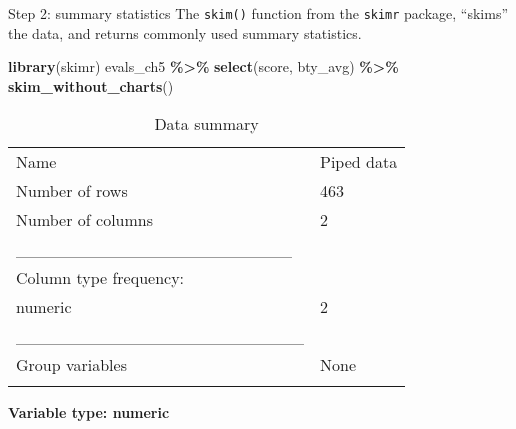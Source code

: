 \documentclass[
  ignorenonframetext,
]{beamer}
\newenvironment{Shaded}{\begin{snugshade}}{\end{snugshade}}
\newcommand{\FunctionTok}[1]{\textcolor[rgb]{0.13,0.29,0.53}{\textbf{#1}}}
\newcommand{\NormalTok}[1]{#1}
\newcommand{\SpecialCharTok}[1]{\textcolor[rgb]{0.81,0.36,0.00}{\textbf{#1}}}
\begin{document}
\begin{frame}[fragile]{Step 2: summary statistics}
\protect\hypertarget{step-2-summary-statistics-1}{}
The \texttt{skim()} function from the \texttt{skimr} package, ``skims''
the data, and returns commonly used summary statistics.

\begin{Shaded}
\begin{Highlighting}[]
\FunctionTok{library}\NormalTok{(skimr)}
\NormalTok{evals\_ch5 }\SpecialCharTok{\%\textgreater{}\%} 
  \FunctionTok{select}\NormalTok{(score, bty\_avg) }\SpecialCharTok{\%\textgreater{}\%} 
  \FunctionTok{skim\_without\_charts}\NormalTok{()}
\end{Highlighting}
\end{Shaded}

\begin{longtable}[]{@{}ll@{}}
\caption{Data summary}\tabularnewline
\toprule\noalign{}
\endfirsthead
\endhead
Name & Piped data \\
Number of rows & 463 \\
Number of columns & 2 \\
\_\_\_\_\_\_\_\_\_\_\_\_\_\_\_\_\_\_\_\_\_\_\_ & \\
Column type frequency: & \\
numeric & 2 \\
\_\_\_\_\_\_\_\_\_\_\_\_\_\_\_\_\_\_\_\_\_\_\_\_ & \\
Group variables & None \\
\bottomrule\noalign{}
\end{longtable}

\textbf{Variable type: numeric}


\end{frame}
\end{document}
